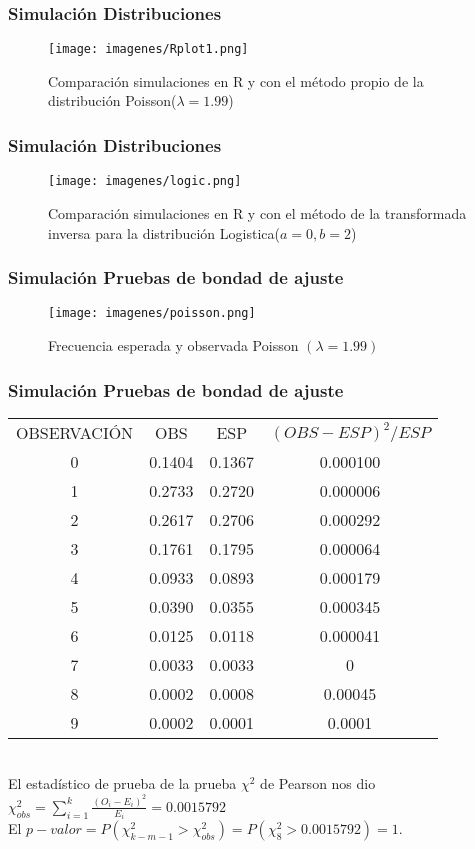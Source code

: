 \documentclass[12pt]{beamer}
\begin{document}
\begin{frame}
\frametitle{Simulación Distribuciones }
\begin{figure}
\centering
\texttt{[image: imagenes/Rplot1.png]}
\caption{Comparación simulaciones en R y con el método propio de la distribución Poisson($\lambda=1.99$)}\label{figura2}
\end{figure}
\end{frame}

\begin{frame}
\frametitle{Simulación Distribuciones}
\begin{figure}
\centering
\texttt{[image: imagenes/logic.png]}
\caption{Comparación simulaciones en R y con el método de la transformada inversa para la distribución Logistica($a=0,b=2$)}\label{figura2}
\end{figure}
\end{frame}

\begin{frame}
\frametitle{Simulación Pruebas de bondad de ajuste}
\begin{figure}
\centering
\texttt{[image: imagenes/poisson.png]}
\caption{Frecuencia esperada y observada Poisson $(\lambda=1.99)$}\label{figura2}
\end{figure}
\end{frame}

\begin{frame}
\frametitle{Simulación Pruebas de bondad de ajuste}
\begin{tabular}{cccc}
\hline 
OBSERVACIÓN & OBS & ESP & $(OBS-ESP)^2/ESP$ \\  
0 & 0.1404 & 0.1367 & 0.000100 \\  
1 & 0.2733 & 0.2720 & 0.000006 \\  
2 & 0.2617 & 0.2706 & 0.000292 \\  
3 & 0.1761 & 0.1795 & 0.000064 \\  
4 & 0.0933 & 0.0893 & 0.000179 \\ 
5 & 0.0390 & 0.0355 & 0.000345 \\  
6 & 0.0125 & 0.0118 & 0.000041 \\  
7 & 0.0033 & 0.0033 & 0 \\  
8 & 0.0002 & 0.0008 & 0.00045 \\  
9 & 0.0002 & 0.0001 & 0.0001 \\ 
\hline 
\end{tabular} 
~\\ El estadístico de prueba de la prueba $\chi^2$ de Pearson nos dio $\chi_{obs}^{2}=\sum\limits_{i=1}^{k}\frac{(O_{i}-E_{i})^2}{E_{i}}=0.0015792$  
~\\ El $p-valor=P(\chi^{2}_{k-m-1}>\chi^{2}_{obs})=P(\chi^{2}_{8}>0.0015792)=1$.
\end{frame}
\end{document}

